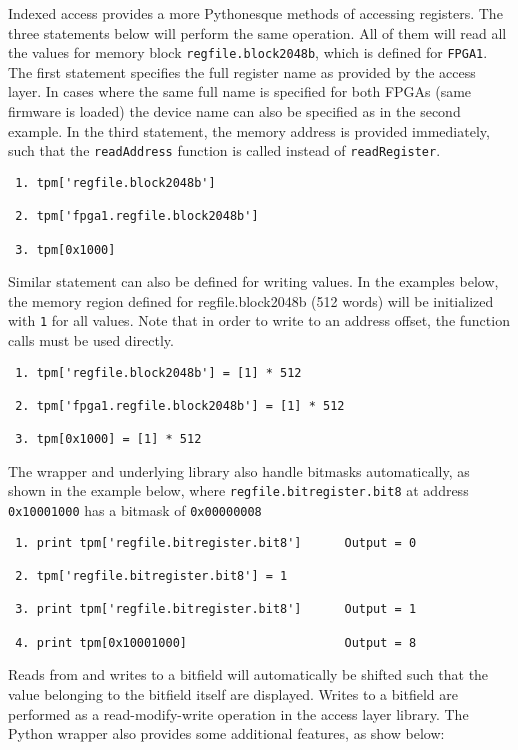 \documentclass[a4paper,11pt]{article}
\begin{document}
Indexed access provides a more Pythonesque methods of accessing registers. The 
three statements below will perform the same operation. All of them will read 
all the values for memory block \texttt{regfile.block2048b}, which is defined 
for \texttt{FPGA1}. The first statement specifies the full register name as 
provided by the access layer. In cases where the same full name is specified 
for both FPGAs (same firmware is loaded) the device name can also be specified 
as in the second example. In the third statement, the memory address is 
provided immediately, such that the \texttt{readAddress} function is called 
instead of \texttt{readRegister}.

\begin{lstlisting} 
 1. tpm['regfile.block2048b']
 
 2. tpm['fpga1.regfile.block2048b']
 
 3. tpm[0x1000]
\end{lstlisting}

Similar statement can also be defined for writing values. In the examples 
below, the memory region defined for regfile.block2048b (512 words) will be 
initialized with \texttt{1} for all values. Note that in order to write to an 
address offset, the function calls must be used directly.

\begin{lstlisting}
 1. tpm['regfile.block2048b'] = [1] * 512
 
 2. tpm['fpga1.regfile.block2048b'] = [1] * 512
 
 3. tpm[0x1000] = [1] * 512
\end{lstlisting}

The wrapper and underlying library also handle bitmasks automatically, as shown 
in the example below, where \texttt{regfile.bitregister.bit8} at address 
\texttt{0x10001000} has a bitmask of \texttt{0x00000008}

\begin{lstlisting}
 1. print tpm['regfile.bitregister.bit8']      Output = 0

 2. tpm['regfile.bitregister.bit8'] = 1
 
 3. print tpm['regfile.bitregister.bit8']      Output = 1
    
 4. print tpm[0x10001000]                      Output = 8
\end{lstlisting}

Reads from and writes to a bitfield will automatically be shifted such that the 
value belonging to the bitfield itself are displayed. Writes to a bitfield are 
performed as a read-modify-write operation in the access layer library. The 
Python wrapper also provides some additional features, as show below:
\end{document}
